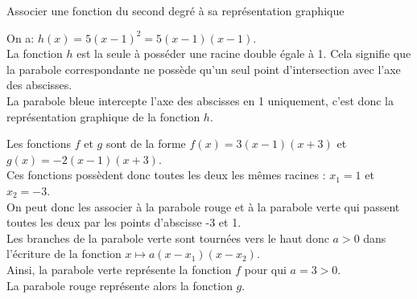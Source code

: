 \begin{bmethodet}{Associer une fonction du second degré à sa représentation graphique}
		\begin{itemMet}
			\item On a: $h(x)=5(x-1)^{2}=5(x-1)(x-1)$.\\
			La fonction $h$ est la seule à posséder une racine double égale à 1. Cela signifie que la parabole correspondante ne possède qu'un seul point d'intersection avec l'axe des abscisses.\\
			La parabole bleue intercepte l'axe des abscisses en 1 uniquement, c'est donc la représentation graphique de la fonction $h$.
			\item Les fonctions $f$ et $g$ sont de la forme $f(x)=3(x-1)(x+3)$ et $g(x)=-2(x-1)(x+3)$.\\
			Ces fonctions possèdent donc toutes les deux les mêmes racines : $x_{1}=1$ et $x_{2}=-3$.\\
			On peut donc les associer à la parabole rouge et à la parabole verte qui passent toutes les deux par les points d'abscisse -3 et 1.\\
			Les branches de la parabole verte sont tournées vers le haut donc $a>0$ dans l'écriture de la fonction $x \mapsto a\left(x-x_{1}\right)\left(x-x_{2}\right)$.\\
			Ainsi, la parabole verte représente la fonction $f$ pour qui $a=3>0$.\\
			La parabole rouge représente alors la fonction $g$.
		\end{itemMet}
		
	\end{bmethodet}	
	
